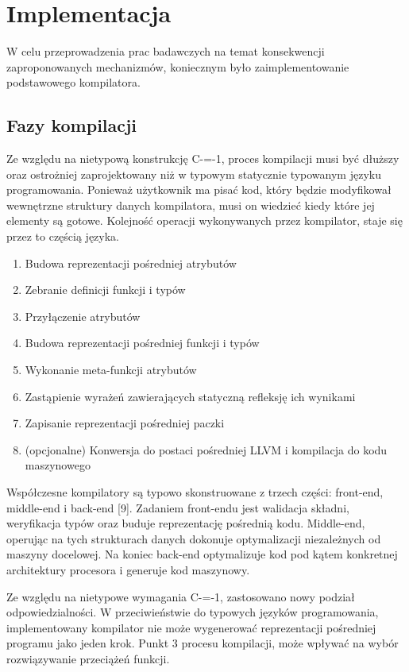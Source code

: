 \section{Implementacja}
W celu przeprowadzenia prac badawczych na temat konsekwencji zaproponowanych mechanizmów, koniecznym było zaimplementowanie podstawowego kompilatora. 
\subsection{Fazy kompilacji}
Ze względu na nietypową konstrukcję C-=-1, proces kompilacji musi być dłuższy oraz ostrożniej zaprojektowany niż w typowym statycznie typowanym języku programowania.
Ponieważ użytkownik ma pisać kod, który będzie modyfikował wewnętrzne struktury danych kompilatora, musi on wiedzieć kiedy które jej elementy są gotowe.
Kolejność operacji wykonywanych przez kompilator, staje się przez to częścią języka.
\begin{enumerate}
    \item Budowa reprezentacji pośredniej atrybutów
    \item Zebranie definicji funkcji i typów
    \item Przyłączenie atrybutów
    \item Budowa reprezentacji pośredniej funkcji i typów
    \item Wykonanie meta-funkcji atrybutów
    \item Zastąpienie wyrażeń zawierających statyczną refleksję ich wynikami
    \item Zapisanie reprezentacji pośredniej paczki
    \item (opcjonalne) Konwersja do postaci pośredniej LLVM i kompilacja do kodu maszynowego
\end{enumerate}

Współczesne kompilatory są typowo skonstruowane z trzech części: front-end, middle-end i back-end [9].
Zadaniem front-endu jest walidacja składni, weryfikacja typów oraz buduje reprezentację pośrednią kodu. Middle-end, operując na tych strukturach danych dokonuje optymalizacji niezależnych od maszyny docelowej.
Na koniec back-end optymalizuje kod pod kątem konkretnej architektury procesora i generuje kod maszynowy.

Ze względu na nietypowe wymagania C-=-1, zastosowano nowy podział odpowiedzialności.
W przeciwieństwie do typowych języków programowania, implementowany kompilator nie może wygenerować reprezentacji pośredniej programu jako jeden krok.
Punkt 3 procesu kompilacji, może wpływać na wybór rozwiązywanie przeciążeń funkcji.


